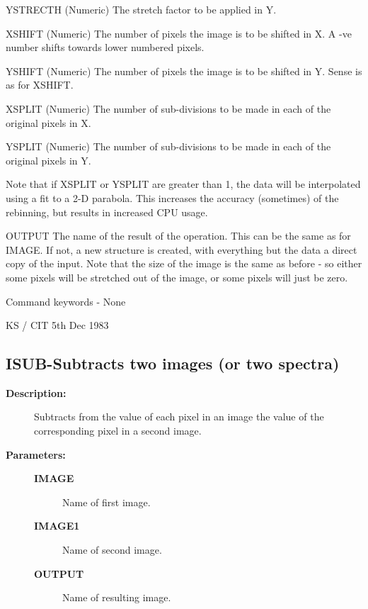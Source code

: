 \begin{description}
\begin{description}
\begin{terminalv}
 YSTRECTH (Numeric) The stretch factor to be applied in Y.

 XSHIFT   (Numeric) The number of pixels the image is to be
          shifted in X.  A -ve number shifts towards lower
          numbered pixels.

 YSHIFT   (Numeric) The number of pixels the image is to be
          shifted in Y.  Sense is as for XSHIFT.

 XSPLIT   (Numeric) The number of sub-divisions to be made in
          each of the original pixels in X.

 YSPLIT   (Numeric) The number of sub-divisions to be made in
          each of the original pixels in Y.

          Note that if XSPLIT or YSPLIT are greater than 1,
          the data will be interpolated using a fit to a 2-D
          parabola.  This increases the accuracy (sometimes)
          of the rebinning, but results in increased CPU usage.

 OUTPUT   The name of the result of the operation.  This can
          be the same as for IMAGE.  If not, a new structure
          is created, with everything but the data a direct
          copy of the input.  Note that the size of the image
          is the same as before - so either some pixels will
          be stretched out of the image, or some pixels will
          just be zero.

 Command keywords -  None

                                  KS / CIT 5th Dec 1983
\end{terminalv}
\end{description}
\subsection{ISUB-\label{ISUB}Subtracts two images (or two spectra)}
\begin{description}

\item [\textbf{Description:}]
 Subtracts from the value of each pixel in an image the
 value of the corresponding pixel in a second image.

\item [\textbf{Parameters:}]
\begin{description}
\item [\textbf{IMAGE}]
 Name of first image.
\item [\textbf{IMAGE1}]
 Name of second image.
\item [\textbf{OUTPUT}]
 Name of resulting image.
\end{description}


\end{description}
\end{description}
